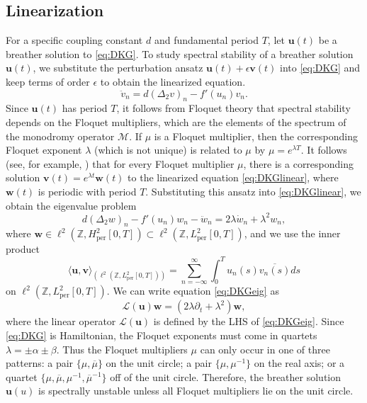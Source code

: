 \documentclass[12pt,reqno]{amsart}
\def\Z{{\mathbb Z}}
\def\per{\textrm{per}}
\def\calL{\mathcal{L}}
\newcommand{\uvec}{\mathbf{u}}
\newcommand{\vvec}{\mathbf{v}}
\newcommand{\wvec}{\mathbf{w}}
\begin{document}
\subsection{Linearization}

For a specific coupling constant $d$ and fundamental period $T$, let $\uvec(t)$ be a breather solution to \cref{eq:DKG}. To study spectral stability of a breather solution $\uvec(t)$, we substitute the perturbation ansatz $\uvec(t) + \epsilon \vvec(t)$ into \cref{eq:DKG} and keep terms of order $\epsilon$ to obtain the linearized equation.
\begin{equation}\label{eq:DKGlinear}
\ddot{v}_n = d (\Delta_2 v)_n - f'(u_n)v_n.
\end{equation}
Since $\uvec(t)$ has period $T$, it follows from Floquet theory that spectral stability depends on the Floquet multipliers, which are the elements of the spectrum of the monodromy operator $\mathcal{M}$. If $\mu$ is a Floquet multiplier, then the corresponding Floquet exponent $\lambda$ (which is not unique) is related to $\mu$ by $\mu = e^{\lambda T}$. It follows (see, for example, \cite[Lemma 2.1.29]{Kapitula2013}) that for every Floquet multiplier $\mu$, there is a corresponding solution $\vvec(t) = e^{\lambda t} \wvec(t)$ to the linearized equation \cref{eq:DKGlinear}, where $\wvec(t)$ is periodic with period $T$. Substituting this ansatz into \cref{eq:DKGlinear}, we obtain the eigenvalue problem
\begin{equation}\label{eq:DKGeig}
d (\Delta_2 w)_n - f'(u_n)w_n - \ddot{w}_n = 2 \lambda \dot{w}_n + \lambda^2 w_n,
\end{equation}
where $\wvec \in \ell^2(\Z, H^2_\per[0,T]) \subset \ell^2(\Z, L^2_\per[0,T])$, and we use the inner product
\begin{equation}\label{eq:IP1}
\langle \uvec, \vvec \rangle_{(\ell^2(\Z, L^2_\per[0,T]))} = \sum_{n=-\infty}^\infty \int_0^T u_n(s) \overline{v_n(s)} ds
\end{equation}
on $\ell^2(\Z, L^2_\per[0,T])$. We can write equation \cref{eq:DKGeig} as 
\begin{equation}\label{eq:DKGeigL}
\calL(\uvec)\wvec = (2 \lambda \partial_t + \lambda^2 )\wvec,
\end{equation}
where the linear operator $\calL(\uvec)$ is defined by the LHS of \cref{eq:DKGeig}. Since \cref{eq:DKG} is Hamiltonian, the Floquet exponents must come in quartets $\lambda = \pm \alpha \pm \beta$. Thus the Floquet multipliers $\mu$ can only occur in one of three patterns: a pair $\{ \mu, \overline{\mu} \}$ on the unit circle; a pair $\{ \mu, \mu^{-1} \}$ on the real axis; or a quartet $\{ \mu, \overline{\mu}, \mu^{-1}, \overline{\mu}^{-1} \}$ off of the unit circle. Therefore, the breather solution $\uvec(u)$ is spectrally unstable unless all Floquet multipliers lie on the unit circle.
\end{document}
